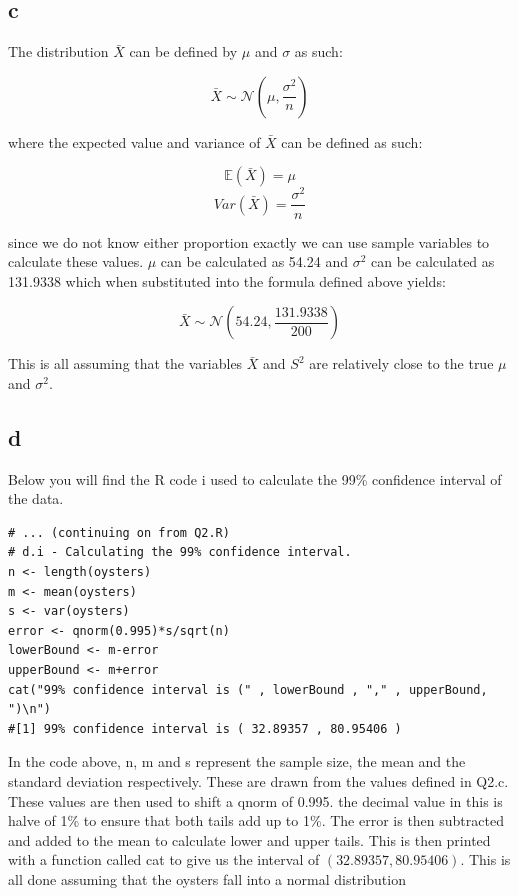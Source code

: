 \documentclass[a4paper, 12pt]{article}
\begin{document}
    \subsection{c}
        The distribution $\bar{X}$ can be defined by $\mu$ and $\sigma$ as such: 

        \[ \bar{X} \sim \mathcal{N} (\mu, \frac{\sigma^2}{n} ) \]

        where the expected value and variance of $\bar{X}$ can be defined as such:

        \[ \mathbb{E} (\bar{X}) = \mu \]
        \[ Var(\bar{X}) = \frac{\sigma^2}{n} \]

        since we do not know either proportion exactly we can use sample variables to calculate these values. $\mu$ can be calculated as 54.24 and $\sigma ^ 2$ can be calculated as 131.9338 which when substituted into the formula defined above yields:

        \[ \bar{X} \sim \mathcal{N} (54.24, \frac{131.9338}{200} )\]

        This is all assuming that the variables $\bar{X}$ and $S^2$ are relatively close to the true $\mu$ and $\sigma ^ 2$.
    \pagebreak

    \subsection{d}
        Below you will find the R code i used to calculate the 99\% confidence interval of the data.

        \begin{lstlisting}
# ... (continuing on from Q2.R)
# d.i - Calculating the 99% confidence interval.
n <- length(oysters)
m <- mean(oysters)
s <- var(oysters)
error <- qnorm(0.995)*s/sqrt(n)
lowerBound <- m-error
upperBound <- m+error
cat("99% confidence interval is (" , lowerBound , "," , upperBound, ")\n")
#[1] 99% confidence interval is ( 32.89357 , 80.95406 )
        \end{lstlisting}
        In the code above, n, m and s represent the sample size, the mean and the standard deviation respectively. These are drawn from the values defined in Q2.c. These values are then used to shift a qnorm of 0.995. the decimal value in this is halve of 1\% to ensure that both tails add up to 1\%. The error is then subtracted and added to the mean to calculate lower and upper tails. This is then printed with a function called cat to give us the interval of $(32.89357, 80.95406)$. This is all done assuming that the oysters fall into a normal distribution
\end{document}

